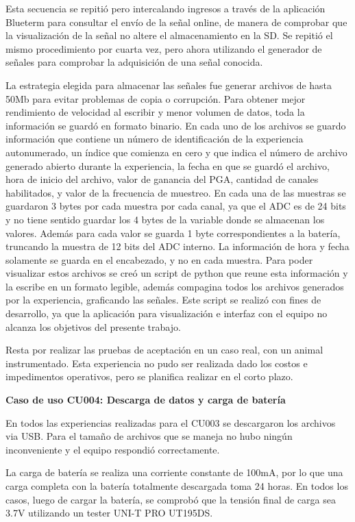 Esta secuencia se repitió pero intercalando ingresos a través de la aplicación Blueterm para consultar el envío de la señal online, de manera de comprobar que la visualización de la señal no altere el almacenamiento en la SD.
Se repitió el mismo procedimiento por cuarta vez, pero ahora utilizando el generador de señales para comprobar la adquisición de una señal conocida. 

La estrategia elegida para almacenar las señales fue generar archivos de hasta 50Mb para evitar problemas de copia o corrupción. Para obtener mejor rendimiento de velocidad al escribir y menor volumen de datos, toda la información se guardó en formato binario. En cada uno de los archivos se guardo información que contiene un número de identificación de la experiencia autonumerado, un índice que comienza en cero y que indica el número de archivo generado abierto durante la experiencia, la fecha en que se guardó el archivo, hora de inicio del archivo, valor de ganancia del PGA, cantidad de canales habilitados, y valor de la frecuencia de muestreo. En cada una de las muestras se guardaron 3 bytes por cada muestra por cada canal, ya que el ADC es de 24 bits y no tiene sentido guardar los 4 bytes de la variable donde se almacenan los valores. Además para cada valor se guarda 1 byte correspondientes a la batería, truncando la muestra de 12 bits del ADC interno. La información de hora y fecha solamente se guarda en el encabezado, y no en cada muestra.
Para poder visualizar estos archivos se creó un script de python que reune esta información y la escribe en un formato legible, además compagina todos los archivos generados por la experiencia, graficando las señales. Este script se realizó con fines de desarrollo, ya que la aplicación para visualización e interfaz con el equipo no alcanza los objetivos del presente trabajo. 

Resta por realizar las pruebas de aceptación en un caso real, con un animal instrumentado. Esta experiencia no pudo ser realizada dado los costos e impedimentos operativos, pero se planifica realizar en el corto plazo.

\textbf{Caso de uso CU004: Descarga de datos y carga de batería}

En todos las experiencias realizadas para el CU003 se descargaron los archivos via USB. Para el tamaño de archivos que se maneja no hubo ningún inconveniente y el equipo respondió correctamente.

La carga de batería se realiza una corriente constante de 100mA, por lo que una carga completa con la batería totalmente descargada toma 24 horas. En todos los casos, luego de cargar la batería, se comprobó que la tensión final de carga sea 3.7V utilizando un tester UNI-T PRO UT195DS. 